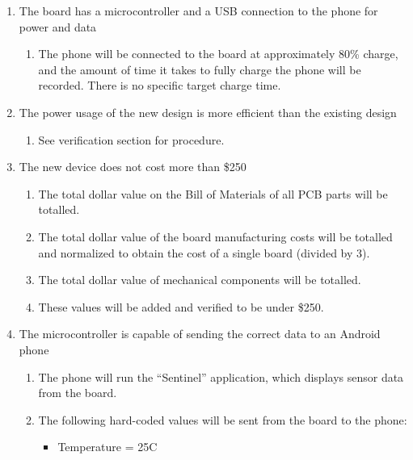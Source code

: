 \documentclass{article}
\numberwithin{figure}{section}
\numberwithin{equation}{section}
\begin{document}
{\begin{enumerate}[align=left,leftmargin=*, labelindent= 0em, label=\textbf{\CheckBox{} Item \thesubsubsection.\arabic*.}, itemindent=0em]
    \item \label{val1}The board has a microcontroller and a USB connection to the phone for power and data
        \begin{enumerate}[label=\CheckBox{}]
            \item The phone will be connected to the board at approximately 80\% charge, and the amount of time it takes to fully charge the phone will be recorded. There is no specific target charge time.
        \end{enumerate}
    \item \label{val2}The power usage of the new design is more efficient than the existing design
        \begin{enumerate}[label=\CheckBox{}]
            \item See verification section for procedure.
        \end{enumerate}
    \item \label{val3}The new device does not cost more than \$250
        \begin{enumerate}[label=\CheckBox{}]
            \item The total dollar value on the Bill of Materials of all PCB parts will be totalled.
            \item The total dollar value of the board manufacturing costs will be totalled and normalized to obtain the cost of a single board (divided by 3).
            \item The total dollar value of mechanical components will be totalled.
            \item These values will be added and verified to be under \$250.
        \end{enumerate}
    \item \label{val4}The microcontroller is capable of sending the correct data to an Android phone
        \begin{enumerate}[label=\CheckBox{}]
            \item The phone will run the ``Sentinel'' application, which displays sensor data from the board.
            \item The following hard-coded values will be sent from the board to the phone:
                \begin{itemize}
                    \item Temperature = 25C

\end{itemize}
\end{enumerate}
\end{enumerate}}
\end{document}
